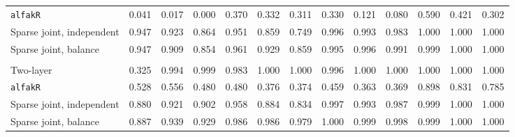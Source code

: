 \begin{center}
\begin{tabular}{l*{12}{r}}
\quad \texttt{alfakR} & 0.041 & 0.017 & 0.000 & 0.370 & 0.332 & 0.311 & 0.330 & 0.121 & 0.080 & 0.590 & 0.421 & 0.302 \\
\quad Sparse joint, independent & 0.947 & 0.923 & 0.864 & 0.951 & 0.859 & 0.749 & 0.996 & 0.993 & 0.983 & 1.000 & 1.000 & 1.000 \\
\quad Sparse joint, balance & 0.947 & 0.909 & 0.854 & 0.961 & 0.929 & 0.859 & 0.995 & 0.996 & 0.991 & 0.999 & 1.000 & 1.000 \\
\addlinespace[2pt]
\multicolumn{13}{l}{\textit{3000/100, 360 d}} \\
\quad Two-layer & 0.325 & 0.994 & 0.999 & 0.983 & 1.000 & 1.000 & 0.996 & 1.000 & 1.000 & 1.000 & 1.000 & 1.000 \\
\quad \texttt{alfakR} & 0.528 & 0.556 & 0.480 & 0.480 & 0.376 & 0.374 & 0.459 & 0.363 & 0.369 & 0.898 & 0.831 & 0.785 \\
\quad Sparse joint, independent & 0.880 & 0.921 & 0.902 & 0.958 & 0.884 & 0.834 & 0.997 & 0.993 & 0.987 & 0.999 & 1.000 & 1.000 \\
\quad Sparse joint, balance & 0.887 & 0.939 & 0.929 & 0.986 & 0.986 & 0.979 & 1.000 & 0.999 & 0.998 & 0.999 & 1.000 & 1.000 \\
\bottomrule
\end{tabular}
\end{center}
